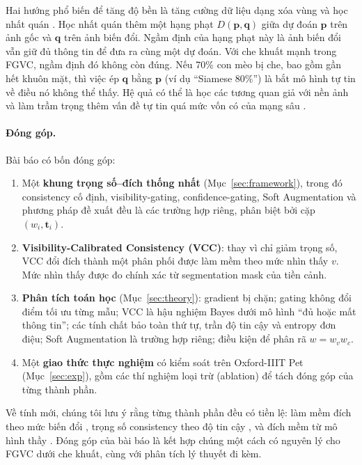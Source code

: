 \documentclass[11pt,a4paper]{article}
\theoremstyle{plain}
\theoremstyle{definition}
\theoremstyle{remark}
\newcommand{\bp}{\bm{p}}
\newcommand{\bq}{\bm{q}}
\newcommand{\bt}{\bm{t}}
\begin{document}
Hai hướng phổ biến để tăng độ bền là tăng cường dữ liệu dạng xóa vùng \cite{zhong2020random,devries2017cutout,singh2017hide,yun2019cutmix} và học nhất quán \cite{laine2017temporal,tarvainen2017mean,zheng2016stability,hendrycks2020augmix}. Học nhất quán thêm một hạng phạt $D(\bp,\bq)$ giữa dự đoán $\bp$ trên ảnh gốc và $\bq$ trên ảnh biến đổi. Ngầm định của hạng phạt này là ảnh biến đổi vẫn giữ đủ thông tin để đưa ra cùng một dự đoán. Với che khuất mạnh trong FGVC, ngầm định đó không còn đúng. Nếu 70\% con mèo bị che, bao gồm gần hết khuôn mặt, thì việc ép $\bq$ bằng $\bp$ (ví dụ ``Siamese 80\%'') là bắt mô hình tự tin về điều nó không thể thấy. Hệ quả có thể là học các tương quan giả với nền ảnh \cite{krothapalli2020adaptive} và làm trầm trọng thêm vấn đề tự tin quá mức vốn có của mạng sâu \cite{guo2017calibration}.

\paragraph{Đóng góp.} Bài báo có bốn đóng góp:
\begin{enumerate}[leftmargin=*,itemsep=2pt]
  \item Một \textbf{khung trọng số--đích thống nhất} (Mục~\ref{sec:framework}), trong đó consistency cố định, visibility-gating, confidence-gating, Soft Augmentation \cite{liu2023soft} và phương pháp đề xuất đều là các trường hợp riêng, phân biệt bởi cặp $(w_i,\bt_i)$.
  \item \textbf{Visibility-Calibrated Consistency (VCC)}: thay vì chỉ giảm trọng số, VCC đổi đích thành một phân phối được làm mềm theo mức nhìn thấy $v$. Mức nhìn thấy được đo chính xác từ segmentation mask của tiền cảnh.
  \item \textbf{Phân tích toán học} (Mục~\ref{sec:theory}): gradient bị chặn; gating không đổi điểm tối ưu từng mẫu; VCC là hậu nghiệm Bayes dưới mô hình ``đủ hoặc mất thông tin''; các tính chất bảo toàn thứ tự, trần độ tin cậy và entropy đơn điệu; Soft Augmentation là trường hợp riêng; điều kiện để phân rã $w=w_v w_c$.
  \item Một \textbf{giao thức thực nghiệm} có kiểm soát trên Oxford-IIIT Pet (Mục~\ref{sec:exp}), gồm các thí nghiệm loại trừ (ablation) để tách đóng góp của từng thành phần.
\end{enumerate}
Về tính mới, chúng tôi lưu ý rằng từng thành phần đều có tiền lệ: làm mềm đích theo mức biến đổi \cite{liu2023soft,siedel2026combined,krothapalli2020adaptive}, trọng số consistency theo độ tin cậy \cite{sohn2020fixmatch,chen2023softmatch,yu2019uncertainty,hoyer2023mic}, và đích mềm từ mô hình thầy \cite{hinton2015distilling}. Đóng góp của bài báo là kết hợp chúng một cách có nguyên lý cho FGVC dưới che khuất, cùng với phân tích lý thuyết đi kèm.
\end{document}
